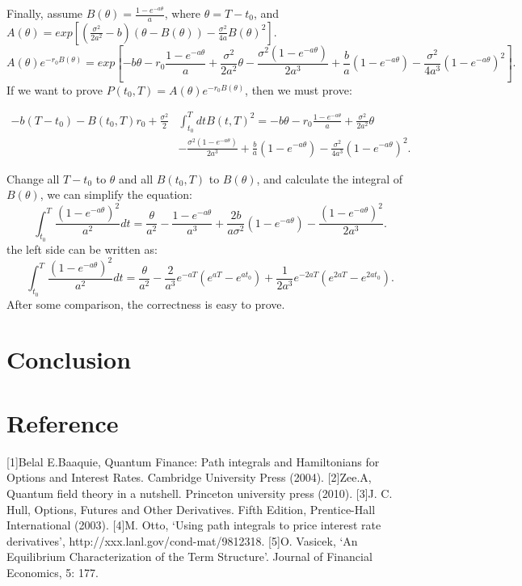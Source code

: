 \documentclass[12pt,a4paper]{paper}
\begin{document}
\indent Finally, assume $B(\theta)=\frac{1-e^{-a\theta}}{a}$, where $\theta=T-t_{0}$, and $A(\theta)=exp[(\frac{\sigma^2}{2a^2}-b)(\theta -B(\theta))-\frac{\sigma ^2}{4a}B(\theta)^2]$.\\
\begin{equation}
A(\theta)e^{-r_{0}B(\theta)}=exp[-b\theta-r_{0}\frac{1-e^{-a\theta}}{a}+\frac{\sigma ^2}{2a^2}\theta - \frac{\sigma ^2 (1-e^{-a\theta})}{2a^3} +\frac{b}{a}(1-e^{-a\theta})-\frac{\sigma ^2}{4a^3}(1-e^{-a\theta})^2].
\end{equation}
\indent If we want to prove $P(t_{0},T)=A(\theta)e^{-r_{0}B(\theta)}$, then we must prove:

\begin{align*}
-b(T-t_{0})-B(t_{0},T)r_{0} +\frac{\sigma ^2}{2}& \int_{t_{0}}^{T}dt B(t,T)^2 =-b\theta-r_{0}\frac{1-e^{-a\theta}}{a}+\frac{\sigma ^2}{2a^2}\theta \\
& - \frac{\sigma ^2 (1-e^{-a\theta})}{2a^3} +\frac{b}{a}(1-e^{-a\theta})-\frac{\sigma ^2}{4a^3}(1-e^{-a\theta})^2.
\end{align*}

Change all $T-t_{0}$ to $\theta$ and all $B(t_{0},T)$ to $B(\theta)$, and calculate the integral of $B(\theta)$, we can simplify the equation:
\begin{equation}
\int_{t_{0}}^{T}\frac{(1-e^{-a\theta})^2}{a^2}dt=\frac{\theta}{a^2}-\frac{1-e^{-a\theta}}{a^3}+\frac{2b}{a\sigma ^2}(1-e^{-a\theta})-\frac{(1-e^{-a\theta})^2}{2a^3}.
\end{equation}
the left side can be written as:
\begin{equation}
\int_{t_{0}}^{T}\frac{(1-e^{-a\theta})^2}{a^2}dt=\frac{\theta}{a^2}-\frac{2}{a^3}e^{-aT}(e^{aT}-e^{at_{0}})+\frac{1}{2a^3}e^{-2aT}(e^{2aT}-e^{2at_{0}}).
\end {equation}
\indent After some comparison, the correctness is easy to prove.

\section{Conclusion}

\section{Reference}
[1]Belal E.Baaquie, Quantum Finance: Path integrals and Hamiltonians for Options and Interest Rates. Cambridge University Press (2004).
[2]Zee.A, Quantum field theory in a nutshell. Princeton university press (2010).
[3]J. C. Hull, Options, Futures and Other Derivatives. Fifth Edition, Prentice-Hall International (2003).
[4]M. Otto, ‘Using path integrals to price interest rate derivatives’, http://xxx.lanl.gov/cond-mat/9812318.
[5]O. Vasicek, ‘An Equilibrium Characterization of the Term Structure’. Journal of Financial Economics, 5: 177.
\end{document}
